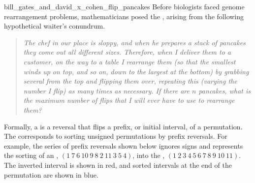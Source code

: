 \vspace{-0.5\baselineskip}

\begin{detour}{bill_gates_and_david_x_cohen_flip_pancakes}
Before biologists faced genome rearrangement problems, mathematicians posed the , arising from the following hypothetical waiter's conundrum.

\begin{quote}
\textit{The chef in our place is sloppy, and when he prepares a stack of pancakes they come out all different sizes. Therefore, when I deliver them to a customer, on the way to a table I rearrange them (so that the smallest winds up on top, and so on, down to the largest at the bottom) by grabbing several from the top and flipping them over, repeating this (varying the number I flip) as many times as necessary. If there are $n$ pancakes, what is the maximum number of flips that I will ever have to use to rearrange them?}
\end{quote}

Formally, a  is a reversal that flips a prefix, or initial interval, of a permutation. The  corresponds to sorting unsigned permutations by prefix reversals.  For example, the series of prefix reversals shown below ignores signs and represents the sorting of an , $(1 ~ 7 ~ 6 ~ 10 ~ 9 ~ 8 ~ 2 ~ 11 ~ 3 ~ 5 ~ 4)$, into the , $(1 ~ 2 ~ 3 ~ 4 ~ 5 ~ 6 ~ 7 ~ 8 ~ 9 ~ 10 ~ 11)$.  The inverted interval is shown in red, and sorted intervals at the end of the permutation are shown in blue.


\end{detour}
